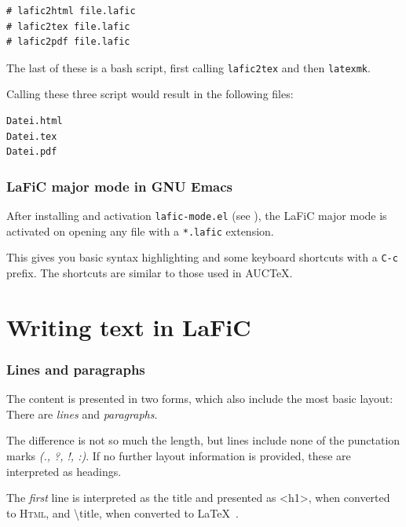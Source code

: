 \documentclass{article}
\begin{document}
\begin{verbatim}
# lafic2html file.lafic
# lafic2tex file.lafic
# lafic2pdf file.lafic
\end{verbatim}


{The last of these is a bash script, first calling \texttt{lafic2tex}
and then \texttt{latexmk}.\\}

{Calling these three script would result in the following
files:\\}

\begin{verbatim}
Datei.html
Datei.tex
Datei.pdf
\end{verbatim}


\section{LaFiC major mode in GNU Emacs}

{After installing and activation \texttt{lafic-mode.el} (see
\xspace ), the LaFiC major mode is activated on opening
any file with a \texttt{*.lafic} extension.\\}

{This gives you basic syntax highlighting and some keyboard
shortcuts with a \texttt{C-c} prefix. The shortcuts are similar to
those used in AUCTeX.\\}

\part{Writing text in LaFiC}
\label{Writing}

\section{Lines and paragraphs}

{The content is presented in two forms, which also include
the most basic layout: There are \emph{lines} and \emph{paragraphs}.\\}

{The difference is not so much the length, but lines include
none of the punctation marks \emph{(., ?, !, :)}. If no
further layout information is provided, these are
interpreted as headings.\\}

{The \emph{first} line is interpreted as the title and presented as
 <h1>, when converted to \textsc{Html}, and \textbackslash title, when 
converted to \LaTeX\ .\\}
\end{document}
